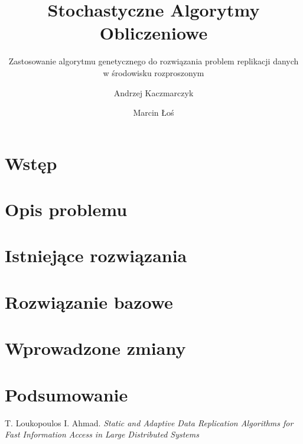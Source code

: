 \documentclass[11pt,pdftex,a4paper]{scrartcl}
\title{Stochastyczne Algorytmy Obliczeniowe}
\subtitle{ 
  Zastosowanie algorytmu genetycznego do rozwiązania problem replikacji danych
  w środowisku rozproszonym
}
\date{}
\author{
  Andrzej Kaczmarczyk
  \and
  Marcin Łoś
}
\begin{document}
\maketitle

\section{Wstęp}

\section{Opis problemu}

\section{Istniejące rozwiązania}

\section{Rozwiązanie bazowe}

\section{Wprowadzone zmiany}

\section{Podsumowanie}

\begin{thebibliography}{}

  T. Loukopoulos I. Ahmad.
  \emph{Static and Adaptive Data Replication Algorithms for Fast Information Access in 
    Large Distributed Systems}

\end{thebibliography}
\end{document}
